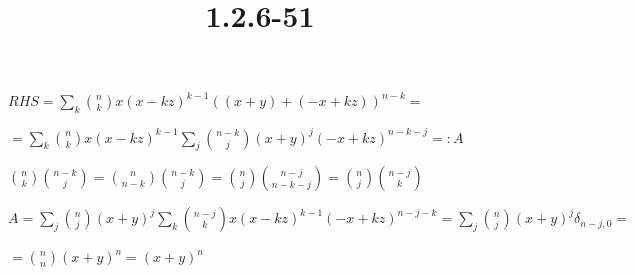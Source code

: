 \documentclass{article}
\title{1.2.6-51}
\begin{document}
\maketitle

\( RHS = \sum_k \binom{n}{k}x(x-kz)^{k-1}((x+y) + (-x+kz))^{n-k} = \)

\( = \sum_k \binom{n}{k} x(x-kz)^{k-1} \sum_{j} \binom{n-k}{j}(x+y)^j(-x+kz)^{n-k-j} =: A \)

\( \binom{n}{k}\binom{n-k}{j} = \binom{n}{n-k}\binom{n-k}{j} = \binom{n}{j}\binom{n-j}{n-k-j} = \binom{n}{j}\binom{n-j}{k} \)

\( A = \sum_j \binom{n}{j}(x+y)^j \sum_k \binom{n-j}{k}x(x-kz)^{k-1}(-x+kz)^{n-j-k} = \sum_j \binom{n}{j}(x+y)^j \delta_{n-j,0} = \)

\( = \binom{n}{n}(x+y)^n = (x+y)^n \)
\end{document}
